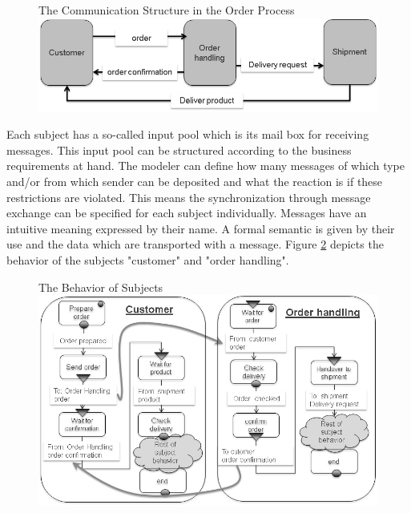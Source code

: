 \strictpagecheck
\begin{figure}[htbp]
	\begin{sidecaption}{The Communication Structure in the Order Process}
	\centering
	\includegraphics[width=0.7\linewidth]{20181026-Ontologie-Bilder/Grafiken-Ontologie/SUbjectExecution/OrderComStructure}
	\end{sidecaption}
	\label{fig:ordercomstructure}
\end{figure}

Each subject has a so-called input pool which is its mail box for receiving messages. This input pool can be structured according to the business requirements at hand. The modeler can define how many messages of which type and/or from which sender can be deposited and what the reaction is if these restrictions are violated. This means the synchronization through message exchange can be specified for each subject individually.
Messages have an intuitive meaning expressed by their name. A formal semantic is given by their use and the data which are transported with a message. Figure \ref{fig:ordercustomerorderhandling} depicts the behavior of the subjects "customer" and "order handling".

\strictpagecheck
\begin{figure}[htbp]
	\begin{sidecaption}{The Behavior of Subjects}
	\centering
	\includegraphics[width=0.9\linewidth]{20181026-Ontologie-Bilder/Grafiken-Ontologie/SUbjectExecution/OrderCustomerOrderHandling}
	\end{sidecaption}
	\label{fig:ordercustomerorderhandling}
\end{figure}

